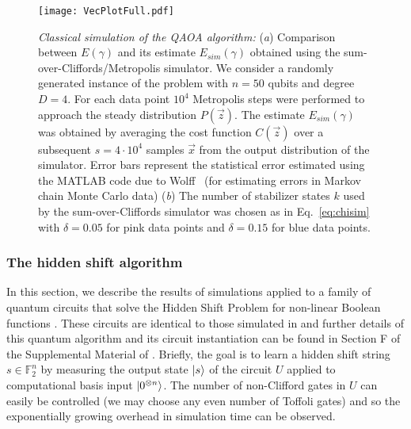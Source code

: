 \begin{figure}
	\centering
	\texttt{[image: VecPlotFull.pdf]}
	\caption{{\em Classical simulation of the QAOA algorithm:}
		(\textit{a}) Comparison between $E(\gamma)$  and its
		estimate $E_{sim}(\gamma)$ obtained using the sum-over-Cliffords/Metropolis simulator.
		We consider a randomly generated instance of the problem with $n=50$ qubits
		and degree $D=4$.
		For each data point  $10^4$ Metropolis steps 
		were performed to approach the steady distribution $P(\vec{z})$.
		The estimate $E_{sim}(\gamma)$ was obtained by
		averaging the cost function $C(\vec{z})$ over a subsequent $s=4\cdot 10^4$ samples 
		$\vec{x}$  from the output distribution of the simulator.
		Error bars represent the statistical error estimated using
		the MATLAB code due to Wolff~\cite{wolff2004monte} (for estimating errors in Markov chain Monte Carlo data) 
		(\textit{b}) The number of stabilizer states $k$ 
		used by the sum-over-Cliffords simulator was chosen as in Eq.~\eqref{eq:chisim} with $\delta=0.05$ for pink data points and $\delta=0.15$ for blue data points.
	}
	\label{fig:QAOAfull}
\end{figure}


\subsubsection{The hidden shift algorithm}
In this section, we describe the results of simulations applied to a family of quantum circuits that solve the Hidden Shift Problem \cite{van_dam_quantum_2006} for non-linear Boolean functions \cite{Roetteler09}. These circuits are identical to those simulated in \cite{bravyi2016improved} and further details of this quantum algorithm and its circuit instantiation can be found in Section F of the Supplemental Material of \cite{bravyi2016improved}. Briefly, the goal is to learn a hidden shift string $s\in \mathbb{F}_2^{n}$ by measuring the output state $|s\rangle$ of the circuit $U$ applied to computational basis input $|0^{\otimes n}\rangle$. The number of non-Clifford gates in $U$ can easily be controlled (we may choose any even number of Toffoli gates) and so the exponentially growing overhead in simulation time can be observed.

